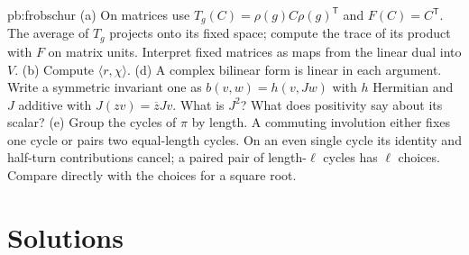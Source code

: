 \begin{hint}{pb:frobschur}
(a) On matrices use $T_g(C)=\rho(g)C\rho(g)^{\mathsf T}$ and $F(C)=C^{\mathsf T}$.
The average of $T_g$ projects onto its fixed space; compute the trace of its
product with $F$ on matrix units. Interpret fixed matrices as maps from the
linear dual into $V$.
(b) Compute $\langle r,\chi\rangle$.
(d) A complex bilinear form is linear in each argument. Write a symmetric
invariant one as $b(v,w)=h(v,Jw)$ with $h$ Hermitian and $J$ additive with
$J(zv)=\overline zJv$. What is $J^2$? What does positivity say about its scalar?
(e) Group the cycles of $\pi$ by length. A commuting involution either fixes
one cycle or pairs two equal-length cycles. On an even single cycle its identity
and half-turn contributions cancel; a paired pair of length-$\ell$ cycles
has $\ell$ choices. Compare directly with the choices for a square root.
\end{hint}

\section{Solutions}

